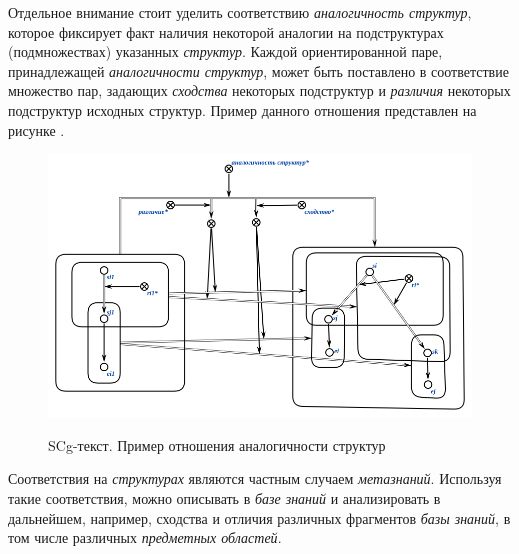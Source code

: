 \bigskip
Отдельное внимание стоит уделить соответствию \textit{аналогичность структур}, которое фиксирует факт наличия некоторой аналогии на подструктурах (подмножествах) указанных \textit{структур}. Каждой ориентированной паре, принадлежащей \textit{аналогичности структур}, может быть поставлено в соответствие множество пар, задающих \textit{сходства} некоторых подструктур и \textit{различия} некоторых подструктур исходных структур. Пример данного отношения представлен на рисунке \textit{}.


\begin{SCn}



\end{SCn}

\begin{figure}[H]
	\caption{SCg-текст. Пример отношения аналогичности структур}
	\includegraphics[scale=0.7]{author/part2/figures/chapter_kb/analogy.png}
	\label{fig:analogy_of_structures}
\end{figure}

Соответствия на \textit{структурах} являются частным случаем \textit{метазнаний}. Используя такие соответствия, можно описывать в \textit{базе знаний} и анализировать в дальнейшем, например, сходства и отличия различных фрагментов \textit{базы знаний}, в том числе различных \textit{предметных областей}.

